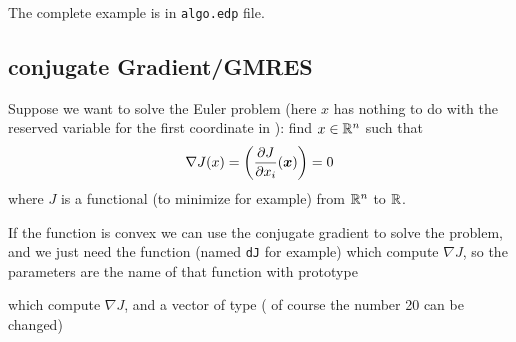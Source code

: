 \documentclass[a4paper,twoside,12pt]{book}
\def\vec#1{\mbox{\boldmath $#1$}}
\def\p{\partial}
\begin{document}
\newcommand{\MyInt}[2]{\displaystyle{\int_{#1} #2 } }
\newcommand{\rhotp}{\rho(\theta,\phi)}
\newcommand{\tp}{(\theta,\phi)}
\newcommand{\dtheta}{\partial_{\theta}}
\newcommand{\dphi}{\partial_{\phi}}

 The complete example is in \texttt{algo.edp} file.

 \subsection{conjugate Gradient/GMRES}

Suppose we want to solve  the Euler problem (here $x$ has nothing to do with the reserved variable for the first coordinate in \freefempp): find $ x\in \mathbb{R}^n $  such that
\begin{equation}
\label{eqn:dJ=0}
\nabla J(x) = \left(\frac{\p J}{\p x_i} (\vec{x})\right) = 0
\end{equation}
where $ J$ is a functional (to minimize  for example) from  $ \mathbb{R}^n$ to $ \mathbb{R}$.

If the function is convex we can use the conjugate gradient to solve the problem,
and we just need the function (named \texttt{dJ} for example)
which compute $\nabla J$, so the parameters
are the name of that function with prototype

 
 which compute $\nabla J$, and
a vector  of type ( of course the number 20 can be changed)

 
\end{document}
